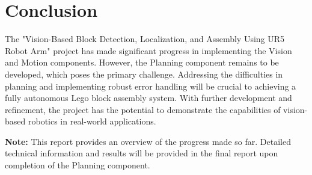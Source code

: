 \documentclass{article}
\begin{document}
	\section{Conclusion}
	The "Vision-Based Block Detection, Localization, and Assembly Using UR5 Robot Arm" project has made significant progress in implementing the Vision and Motion components. However, the Planning component remains to be developed, which poses the primary challenge. Addressing the difficulties in planning and implementing robust error handling will be crucial to achieving a fully autonomous Lego block assembly system. With further development and refinement, the project has the potential to demonstrate the capabilities of vision-based robotics in real-world applications.
	
	\textbf{Note:} This report provides an overview of the progress made so far. Detailed technical information and results will be provided in the final report upon completion of the Planning component.
	
\end{document}

